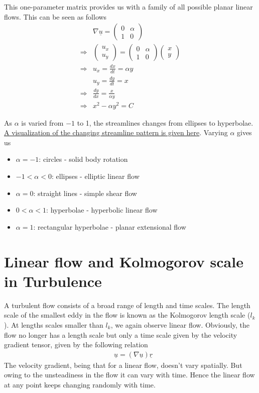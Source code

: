 \documentclass[11pt,a4paper]{article}
\newcommand{\vv}[1]{\underline{#1}}
\newcommand{\vu}{\underline{u}}
\newcommand{\1}{\vect{1}}
\newcommand{\grad}{\nabla}
\newcommand{\RA}{\Rightarrow}
\begin{document}
This one-parameter matrix provides us with a family of all possible planar linear flows. This can be seen as follows
\begin{align*}
&\grad \vv u = {\begin{pmatrix}
0 & \alpha \\
1 & 0
\end{pmatrix}}\\
\RA& {\begin{pmatrix}
u_x\\
u_y 
\end{pmatrix}} = {\begin{pmatrix}
0 & \alpha\\
1 & 0
\end{pmatrix}}{\begin{pmatrix}
x\\
y 
\end{pmatrix}}\\
\RA& u_x = \frac{dx}{dt} = \alpha y\\
& u_y = \frac{dy}{dt} = x\\
\RA& \frac{dy}{dx} = \frac{x}{\alpha y}\\
\RA& x^2 - \alpha y ^2 = C
\end{align*}

As $\alpha$ is varied from $-1$ to 1, the streamlines changes from ellipses to hyperbolae. \href{https://www.desmos.com/calculator/tgi3v0qbqf}{A visualization of the changing streamline pattern is given here}. Varying $\alpha$ gives us
\begin{itemize}
\item $\alpha = -1$: circles - solid body rotation
\item $ -1<\alpha <0$: ellipses - elliptic linear flow
\item $ \alpha = 0$: straight lines - simple shear flow 
\item $0<\alpha <1$: hyperbolae - hyperbolic linear flow 
\item $ \alpha = 1$: rectangular hyperbolae - planar extensional flow 
\end{itemize}

\section{Linear flow and Kolmogorov scale in Turbulence}

A turbulent flow consists of a broad range of length and time scales. The length scale of the smallest eddy in the flow is known as the Kolmogorov length scale ($l_k$). At lengths scales smaller than $l_k$, we again observe linear flow. Obviously, the flow no longer has a length scale but only a time scale given by the velocity gradient tensor, given by the following relation
\begin{align*}
&\vu = (\grad \vu) \vv r
\end{align*}
The velocity gradient, being that for a linear flow, doesn't vary spatially. But owing to the unsteadiness in the flow it can vary with time. Hence the linear flow at any point keeps changing randomly with time. 
\end{document}
